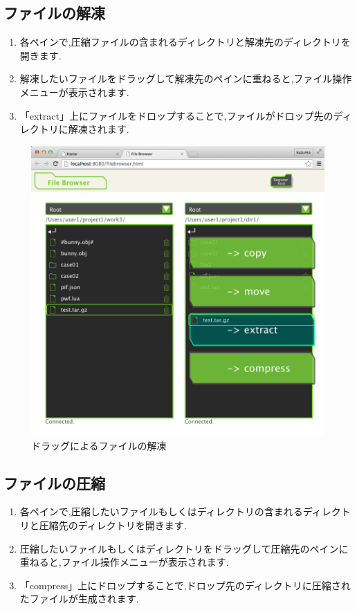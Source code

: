 \documentclass[a4paper,10pt,oneside]{jsbook}
\begin{document}
\newpage

\subsection{ファイルの解凍}
\begin{enumerate}
	\item 各ペインで,圧縮ファイルの含まれるディレクトリと解凍先のディレクトリを開きます.
	\item 解凍したいファイルをドラッグして解凍先のペインに重ねると,ファイル操作メニューが表示されます.
	\item 「extract」上にファイルをドロップすることで,ファイルがドロップ先のディレクトリに解凍されます.
\end{enumerate}

\begin{figure}[H]
	\begin{center}
		\includegraphics[width=12.0cm]{image/filebrowser_005.png}
	\end{center}
	\caption{ドラッグによるファイルの解凍}
	\label{fig:filebrowser_fileextract}
\end{figure}

\newpage

\subsection{ファイルの圧縮}
\begin{enumerate}
	\item 各ペインで,圧縮したいファイルもしくはディレクトリの含まれるディレクトリと圧縮先のディレクトリを開きます.
	\item 圧縮したいファイルもしくはディレクトリをドラッグして圧縮先のペインに重ねると,ファイル操作メニューが表示されます.
	\item「compress」上にドロップすることで,ドロップ先のディレクトリに圧縮されたファイルが生成されます.
\end{enumerate}
\end{document}
